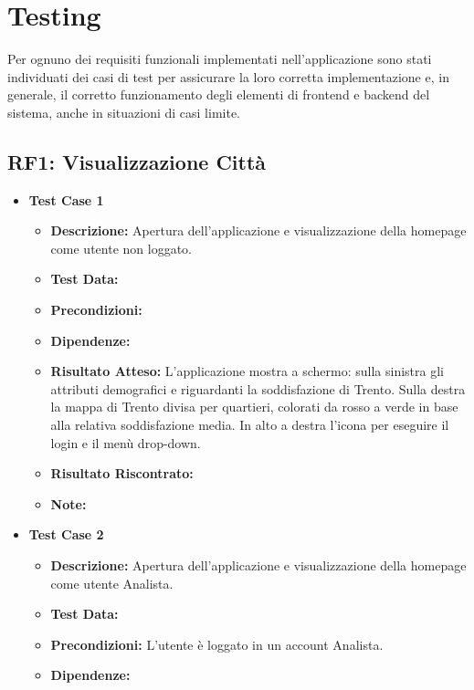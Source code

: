 \section{Testing}

    Per ognuno dei requisiti funzionali implementati nell'applicazione sono stati individuati dei casi di test per assicurare la loro corretta implementazione e, in generale, il corretto funzionamento degli elementi di frontend e backend del sistema, anche in situazioni di casi limite.

    \subsection{RF1: Visualizzazione Città}
        \begin{itemize}
            \item \textbf{Test Case 1}
                \begin{itemize}
                    \item \textbf{Descrizione:} Apertura dell'applicazione e visualizzazione della homepage come utente non loggato.
                    \item \textbf{Test Data:}
                    \item \textbf{Precondizioni:} 
                    \item \textbf{Dipendenze:}
                    \item \textbf{Risultato Atteso:} L'applicazione mostra a schermo: sulla sinistra gli attributi demografici e riguardanti la soddisfazione di Trento. Sulla destra la mappa di Trento divisa per quartieri, colorati da rosso a verde in base alla relativa soddisfazione media. In alto a destra l'icona per eseguire il login e il menù drop-down.
                    \item \textbf{Risultato Riscontrato:}
                    \item \textbf{Note:}
                \end{itemize}
            \item \textbf{Test Case 2}
                \begin{itemize}
                    \item \textbf{Descrizione:} Apertura dell'applicazione e visualizzazione della homepage come utente Analista.
                    \item \textbf{Test Data:}
                    \item \textbf{Precondizioni:} L'utente è loggato in un account Analista.
                    \item \textbf{Dipendenze:}

\end{itemize}
\end{itemize}
